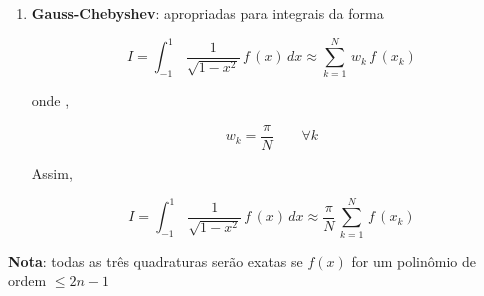 \begin{enumerate}
\begin{enumerate}
\item
\textbf{Gauss-Chebyshev}: apropriadas para integrais da forma

\[
 I = \int_{-1}^1 \, \frac{1}{\sqrt{1-x^2}} \, f\,(x) \, dx \approx \sum_{k=1}^N \, w_k \, f\,(x_k)
\]

onde , 

\[
 w_k = \frac{\pi}{N} \qquad \forall k
\]

Assim,

\[
 I = \int_{-1}^1 \, \frac{1}{\sqrt{1-x^2}} \, f\,(x) \, dx \approx \frac{\pi}{N} \, \sum_{k=1}^N \, f\,(x_k)
\]

\end{enumerate}

\end{enumerate}

\textbf{Nota}: todas as três quadraturas serão exatas se $f(x)$ for um polinômio de ordem $\leq 2n-1$ 